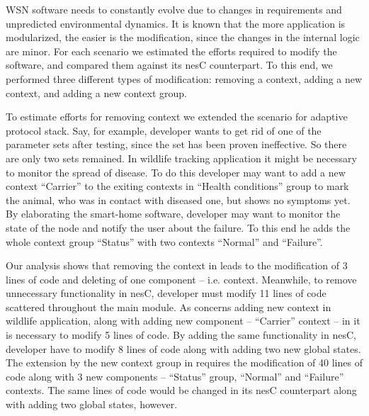 WSN software needs to constantly evolve due to changes in requirements and
unpredicted environmental dynamics. It is known that the more application is
modularized, the easier is the modification, since the changes in the internal
logic are minor. For each scenario we estimated the efforts required to modify
the \conesc software, and compared them against its nesC counterpart. To this
end, we performed three different types of modification: removing a context,
adding a new context, and adding a new context group.

To estimate efforts for removing context we extended the scenario for adaptive
protocol stack. Say, for example, developer wants to get rid of one of the
parameter sets after testing, since the set has been proven ineffective. So
there are only two sets remained. In wildlife tracking application it might be
necessary to monitor the spread of disease. To do this developer may want to add
a new context ``Carrier'' to the exiting contexts in ``Health conditions'' group
to mark the animal, who was in contact with diseased one, but shows no symptoms
yet. By elaborating the smart-home software, developer may want to monitor the
state of the node and notify the user about the failure. To this end he adds the
whole context group ``Status'' with two contexts ``Normal'' and
``Failure''.

 Our analysis shows that removing the context in \conesc leads
to the modification of 3 lines of code and deleting of one component -- i.e.
context. Meanwhile, to remove unnecessary functionality in nesC, developer must
modify 11 lines of code scattered throughout the main module. As concerns adding
new context in wildlife application, along with adding new component --
``Carrier'' context -- in \conesc it is necessary to modify 5 lines of code. By
adding the same functionality in nesC, developer have to modify 8 lines of code
along with adding two new global states. The extension by the new context group
in \conesc requires the modification of 40 lines of code along with 3 new
components -- ``Status'' group, ``Normal'' and ``Failure'' contexts. The same
lines of code would be changed in its nesC counterpart along with adding two
global states, however.


